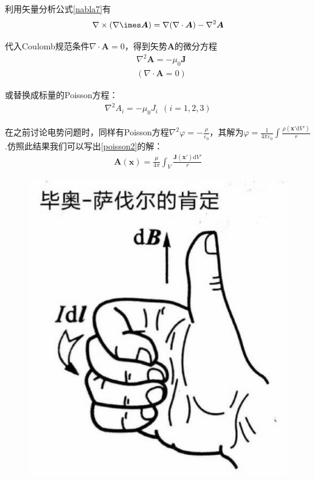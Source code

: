 \documentclass[main.tex]{subfiles}
\begin{document}
利用矢量分析公式\ref{nabla7}有
\begin{align}
    \nabla \times (\nabla \imes \boldsymbol{A}) = \nabla(\nabla \cdot \boldsymbol{A}) - \nabla ^2 \boldsymbol{A}
\end{align}

代入Coulomb规范条件$\nabla \cdot \boldsymbol{A} = 0$，得到矢势$\boldsymbol{A}$的微分方程
\begin{align}
    &\nabla ^2 \boldsymbol{A} = -\mu _0 \boldsymbol{J}\\
    &(\nabla \cdot \boldsymbol{A} = 0)
\end{align}

或替换成标量的Poisson方程：
\begin{align}
    \label{poisson2}\nabla ^2 A_i = -\mu _0 J_i\ \ (i = 1,2,3)
\end{align}

在之前讨论电势问题时，同样有Poisson方程$\nabla ^2\varphi = -\frac{\rho}{\varepsilon _0}$，其解为$\varphi = \frac{1}{4\pi \varepsilon _0}\int \frac{\rho(\boldsymbol{x}'\mathrm{d}V')}{r}$.仿照此结果我们可以写出\ref{poisson2}的解：
\begin{align}
    \boldsymbol{A}(\boldsymbol{x}) = \frac{\mu}{4\pi}\int _{V}^{}\frac{\boldsymbol{J}(\boldsymbol{x}')\mathrm{d}V'}{r}
\end{align}

\begin{figure}
	\centering
	\includegraphics[width=0.9\linewidth]{Biot-Savart.jpg}
\end{figure}
\end{document}
